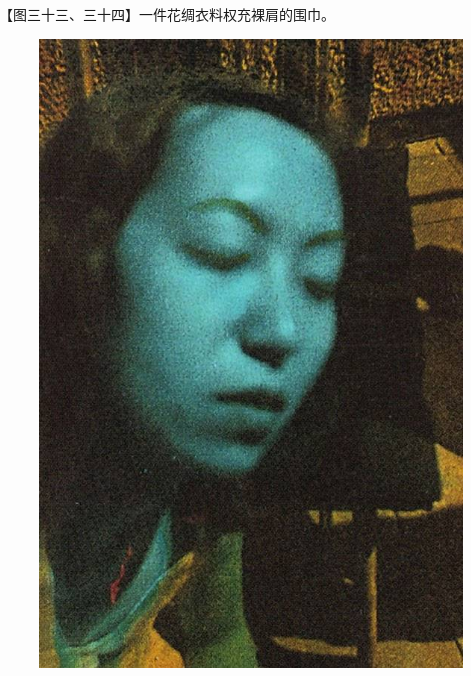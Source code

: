 \clearpage
\par 【图三十三、三十四】一件花绸衣料权充裸肩的围巾。
\begin{figure}[htb]
    \centering %
    \includegraphics[scale=0.35]{picture/对照记33.jpeg}

\end{figure}
